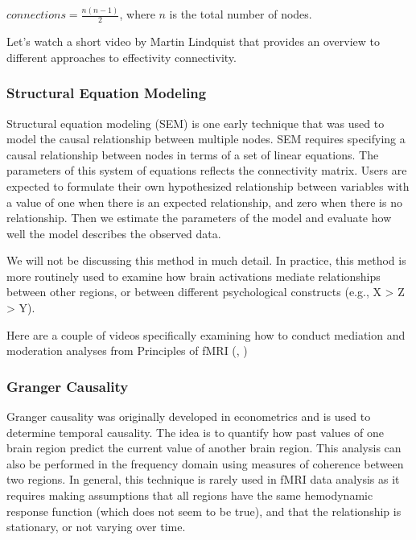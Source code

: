 \documentclass[letterpaper,10pt,english]{sphinxmanual}
\begin{document}
\(connections = \frac{n(n-1)}{2}\), where \(n\) is the total number of nodes.

Let’s watch a short video by Martin Lindquist that provides an overview to different approaches to effectivity connectivity.

\begin{sphinxVerbatim}[commandchars=\\\{\}]
\end{sphinxVerbatim}

\noindent{}


\subsubsection{Structural Equation Modeling}
\label{\detokenize{content/Connectivity:structural-equation-modeling}}
Structural equation modeling (SEM) is one early technique that was used to model the causal relationship between multiple nodes. SEM requires specifying a causal relationship between nodes in terms of a set of linear equations. The parameters of this system of equations reflects the connectivity matrix. Users are expected to formulate their own hypothesized relationship between variables with a value of one when there is an expected relationship, and zero when there is no relationship. Then we estimate the parameters of the model and evaluate how well the model describes the observed data.


We will not be discussing this method in much detail. In practice, this method is more routinely used to examine how brain activations mediate relationships between other regions, or between different psychological constructs (e.g., X \sphinxhyphen{}\textgreater{} Z \sphinxhyphen{}\textgreater{} Y).

Here are a couple of videos specifically examining how to conduct mediation and moderation analyses from Principles of fMRI (,
)


\subsubsection{Granger Causality}
\label{\detokenize{content/Connectivity:granger-causality}}
Granger causality was originally developed in econometrics and is used to determine temporal causality. The idea is to quantify how past values of one brain region predict the current value of another brain region. This analysis can also be performed in the frequency domain using measures of coherence between two regions. In general, this technique is rarely used in fMRI data analysis as it requires making assumptions that all regions have the same hemodynamic response function (which does not seem to be true), and that the relationship is stationary, or not varying over time.
\end{document}
